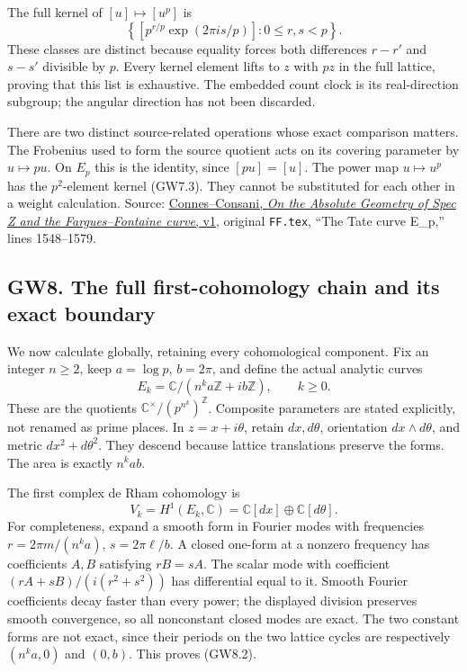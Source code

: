 The full kernel of \([u]\mapsto[u^p]\) is \[
\left\{\left[p^{r/p}\exp(2\pi i s/p)\right]:0\le r,s<p\right\}.
\tag{GW7.3}
\] These classes are distinct because equality forces both differences
\(r-r'\) and \(s-s'\) divisible by \(p\). Every kernel element lifts to
\(z\) with \(pz\) in the full lattice, proving that this list is
exhaustive. The embedded count clock is its real-direction subgroup; the
angular direction has not been discarded.

There are two distinct source-related operations whose exact comparison
matters. The Frobenius used to form the source quotient acts on its
covering parameter by \(u\mapsto pu\). On \(E_p\) this is the identity,
since \([pu]=[u]\). The power map \(u\mapsto u^p\) has the
\(p^2\)-element kernel (GW7.3). They cannot be substituted for each
other in a weight calculation. Source:
\href{https://arxiv.org/abs/2606.06604v1}{Connes--Consani, \emph{On the
Absolute Geometry of Spec Z and the Fargues--Fontaine curve}, v1},
original \nolinkurl{FF.tex}, ``The Tate curve E\_p,'' lines 1548--1579.

\subsection{GW8. The full first-cohomology chain and its exact
boundary}\label{gw20260924-gw8.-the-full-first-cohomology-chain-and-its-exact-boundary}

We now calculate globally, retaining every cohomological component. Fix
an integer \(n\ge2\), keep \(a=\log p\), \(b=2\pi\), and define the
actual analytic curves \[
E_k=\mathbb C/(n^ka\mathbb Z+ib\mathbb Z),\qquad k\ge0.
\tag{GW8.1}
\] These are the quotients \(\mathbb C^\times/(p^{n^k})^{\mathbb Z}\).
Composite parameters are stated explicitly, not renamed as prime places.
In \(z=x+i\theta\), retain \(dx,d\theta\), orientation
\(dx\wedge d\theta\), and metric \(dx^2+d\theta^2\). They descend
because lattice translations preserve the forms. The area is exactly
\(n^kab\).

The first complex de Rham cohomology is \[
V_k=H^1(E_k,\mathbb C)=\mathbb C[dx]\oplus\mathbb C[d\theta].
\tag{GW8.2}
\] For completeness, expand a smooth form in Fourier modes with
frequencies \(r=2\pi m/(n^ka)\), \(s=2\pi\ell/b\). A closed one-form at
a nonzero frequency has coefficients \(A,B\) satisfying \(rB=sA\). The
scalar mode with coefficient \((rA+sB)/(i(r^2+s^2))\) has differential
equal to it. Smooth Fourier coefficients decay faster than every power;
the displayed division preserves smooth convergence, so all nonconstant
closed modes are exact. The two constant forms are not exact, since
their periods on the two lattice cycles are respectively \((n^ka,0)\)
and \((0,b)\). This proves (GW8.2).

